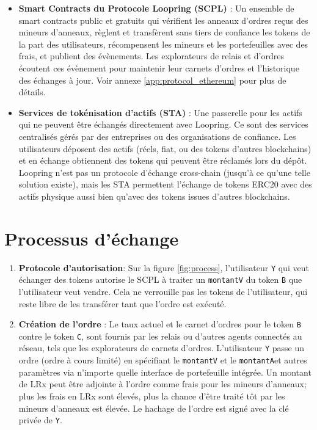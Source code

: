 \documentclass[UTF8,nofonts]{article}
\begin{document}
\begin{multicols}{2}
\begin{itemize}
\item \textbf{Smart Contracts du Protocole Loopring (SCPL)} : Un ensemble de smart contracts public et gratuits qui vérifient les anneaux d'ordres reçus des mineurs d'anneaux, règlent et transfèrent sans tiers de confiance les tokens de la part des utilisateurs, récompensent les mineurs et les portefeuilles avec des frais, et publient des évènements. Les explorateurs de relais et d'ordres écoutent ces évènement pour maintenir leur carnets d'ordres et l'historique des échanges à jour. Voir annexe \ref{app:protocol_ethereum} pour plus de détails.

\item \textbf{Services de tokénisation d'actifs (STA)} : Une passerelle pour les actifs qui ne peuvent être échangés directement avec Loopring. Ce sont des services centralisés gérés par des entreprises ou des organisations de confiance. Les utilisateurs déposent des actifs (réels, fiat, ou des tokens d'autres blockchains) et en échange obtiennent des tokens qui peuvent être réclamés lors du dépôt. Loopring n'est pas un protocole d'échange cross-chain (jusqu'à ce qu'une telle solution existe), mais les STA permettent l'échange de tokens ERC20 \cite{ERC20} avec des actifs physique aussi bien qu'avec des tokens issues d'autres blockchains. 

\end{itemize}


\section{Processus d'échange\label{sec:process}}



\begin{enumerate} 


\item \textbf{Protocole d'autorisation}: Sur la figure \ref{fig:process}, l'utilisateur \verb|Y| qui veut échanger des tokens autorise le SCPL à traiter un \verb|montantV| du token \verb|B| que l'utilisateur veut vendre. Cela ne verrouille pas les tokens de l'utilisateur, qui reste libre de les transférer tant que l'ordre est exécuté.

\item \textbf{Création de l'ordre} : Le taux actuel et le carnet d'ordres pour le token \verb|B| contre le token \verb|C|, sont fournis par les relais ou d'autres agents connectés au réseau, tels que les explorateurs de carnets d'ordres. L'utilisateur \verb|Y| passe un ordre (ordre à cours limité) en spécifiant le \verb|montantV| et le  \verb|montantA|et autres paramètres via n'importe quelle interface de portefeuille intégrée. Un montant de LRx peut être adjointe à l'ordre comme frais pour les mineurs d'anneaux; plus les frais en LRx sont élevés, plus la chance d'être traité tôt par les mineurs d'anneaux est élevée. Le hachage de l'ordre est signé avec la clé privée de \verb|Y|.


\end{enumerate}
\end{multicols}
\end{document}
